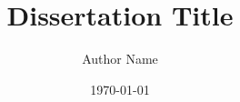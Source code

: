 
\title{Dissertation Title}
\author{Author Name}
\date{\today}

\usepackage{amsmath}
\usepackage{amsfonts}
\usepackage{amssymb}
\usepackage{graphicx}
\usepackage{longtable}
\usepackage{booktabs}
\usepackage{array}
\usepackage{multirow}

\newcommand{\todo}[1]{\textcolor{red}{TODO: #1}}